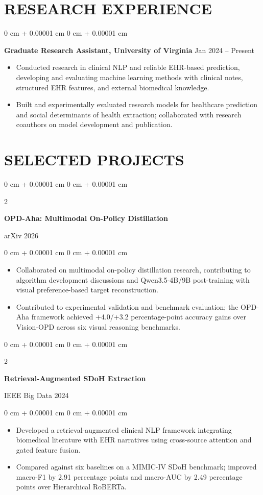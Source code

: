 \documentclass[10pt, letterpaper]{article}
\newenvironment{highlights}{
    \begin{itemize}[
        topsep=0.03 cm,
        parsep=0.03 cm,
        partopsep=0pt,
        itemsep=0pt,
        leftmargin=0 cm + 10pt
    ]
}{
    \end{itemize}
} %
\newenvironment{onecolentry}{
    \begin{adjustwidth}{
        0 cm + 0.00001 cm
    }{
        0 cm + 0.00001 cm
    }
}{
    \end{adjustwidth}
} %
\newenvironment{twocolentry}[2][]{
    \onecolentry
    \def\secondColumn{#2}
    \setcolumnwidth{\fill, 4.5 cm}
    \begin{paracol}{2}
}{
    \switchcolumn \raggedleft \secondColumn
    \end{paracol}
    \endonecolentry
} %
\begin{document}
\section{RESEARCH EXPERIENCE}
\begin{onecolentry}
\textbf{Graduate Research Assistant, University of Virginia} \hfill Jan 2024 -- Present
\begin{highlights}
\item Conducted research in clinical NLP and reliable EHR-based prediction, developing and evaluating machine learning methods with clinical notes, structured EHR features, and external biomedical knowledge.
\item Built and experimentally evaluated research models for healthcare prediction and social determinants of health extraction; collaborated with research coauthors on model development and publication.
\end{highlights}
\end{onecolentry}
\section{SELECTED PROJECTS}

\begin{twocolentry}{arXiv 2026}
\textbf{OPD-Aha: Multimodal On-Policy Distillation}
\end{twocolentry}
\begin{onecolentry}
\begin{highlights}
\item Collaborated on multimodal on-policy distillation research, contributing to algorithm development discussions and Qwen3.5-4B/9B post-training with visual preference-based target reconstruction.
\item Contributed to experimental validation and benchmark evaluation; the OPD-Aha framework achieved +4.0/+3.2 percentage-point accuracy gains over Vision-OPD across six visual reasoning benchmarks.
\end{highlights}
\end{onecolentry}
\vspace{0.06 cm}

\begin{twocolentry}{IEEE Big Data 2024}
\textbf{Retrieval-Augmented SDoH Extraction}
\end{twocolentry}
\begin{onecolentry}
\begin{highlights}
\item Developed a retrieval-augmented clinical NLP framework integrating biomedical literature with EHR narratives using cross-source attention and gated feature fusion.
\item Compared against six baselines on a MIMIC-IV SDoH benchmark; improved macro-F1 by 2.91 percentage points and macro-AUC by 2.49 percentage points over Hierarchical RoBERTa.
\end{highlights}
\end{onecolentry}
\vspace{0.06 cm}
\end{document}
